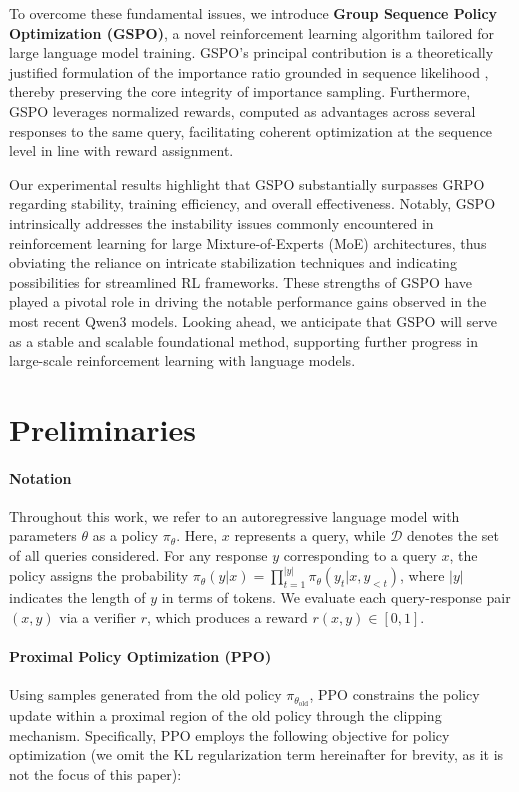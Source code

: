 To overcome these fundamental issues, we introduce \textbf{Group Sequence Policy Optimization (GSPO)}, a novel reinforcement learning algorithm tailored for large language model training. GSPO’s principal contribution is a theoretically justified formulation of the importance ratio grounded in sequence likelihood \citep{click}, thereby preserving the core integrity of importance sampling. Furthermore, GSPO leverages normalized rewards, computed as advantages across several responses to the same query, facilitating coherent optimization at the sequence level in line with reward assignment.

Our experimental results highlight that GSPO substantially surpasses GRPO regarding stability, training efficiency, and overall effectiveness. Notably, GSPO intrinsically addresses the instability issues commonly encountered in reinforcement learning for large Mixture-of-Experts (MoE) architectures, thus obviating the reliance on intricate stabilization techniques and indicating possibilities for streamlined RL frameworks. These strengths of GSPO have played a pivotal role in driving the notable performance gains observed in the most recent Qwen3 models. Looking ahead, we anticipate that GSPO will serve as a stable and scalable foundational method, supporting further progress in large-scale reinforcement learning with language models.

\section{Preliminaries}

\paragraph{Notation}
Throughout this work, we refer to an autoregressive language model with parameters $\theta$ as a policy $\pi_\theta$. Here, $x$ represents a query, while $\mathcal{D}$ denotes the set of all queries considered. For any response $y$ corresponding to a query $x$, the policy assigns the probability $\pi_\theta (y | x) = \prod_{t=1}^{|y|} \pi_\theta (y_t | x, y_{<t} )$, where $|y|$ indicates the length of $y$ in terms of tokens. We evaluate each query-response pair $(x, y)$ via a verifier $r$, which produces a reward $r(x, y) \in [ 0, 1 ]$.

\paragraph{Proximal Policy Optimization (PPO)} Using samples generated from the old policy $\pi_{\theta_\text{old}}$, PPO \citep{ppo} constrains the policy update within a proximal region of the old policy through the clipping mechanism. Specifically, PPO employs the following objective for policy optimization (we omit the KL regularization term hereinafter for brevity, as it is not the focus of this paper):

